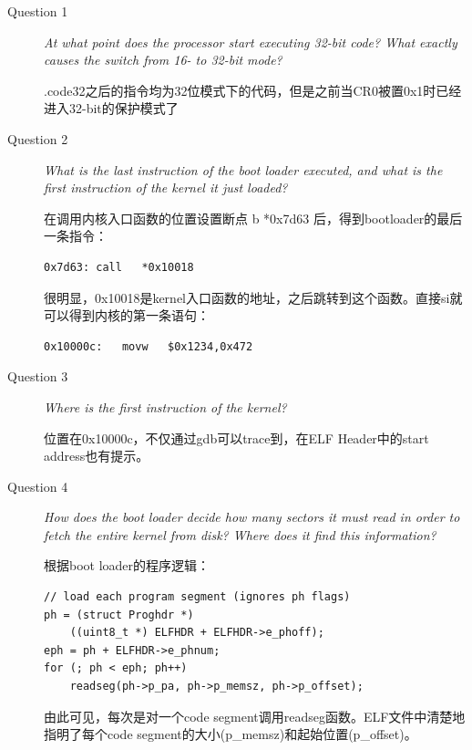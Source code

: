 \begin{description}
\item[Question 1] \textit{At what point does the processor start executing 32-bit code? What exactly causes the switch from 16- to 32-bit mode?}

.code32之后的指令均为32位模式下的代码，但是之前当CR0被置0x1时已经进入32-bit的保护模式了

\item[Question 2] \textit{What is the last instruction of the boot loader executed, and what is the first instruction of the kernel it just loaded?} 

在调用内核入口函数的位置设置断点 b *0x7d63 后，得到bootloader的最后一条指令：\\

\begin{lstlisting}[language={[x86masm]Assembler}]
0x7d63:	call   *0x10018
\end{lstlisting}

很明显，0x10018是kernel入口函数的地址，之后跳转到这个函数。直接si就可以得到内核的第一条语句：\\
\begin{lstlisting}[language={[x86masm]Assembler}]
0x10000c:	movw   $0x1234,0x472
\end{lstlisting}

\item[Question 3] \textit{Where is the first instruction of the kernel?}

位置在0x10000c，不仅通过gdb可以trace到，在ELF Header中的start address也有提示。

\item[Question 4] \textit{How does the boot loader decide how many sectors it must read in order to fetch the entire kernel from disk? Where does it find this information?}

根据boot loader的程序逻辑：\\
\begin{lstlisting}
// load each program segment (ignores ph flags)
ph = (struct Proghdr *) 
    ((uint8_t *) ELFHDR + ELFHDR->e_phoff);
eph = ph + ELFHDR->e_phnum;
for (; ph < eph; ph++)
	readseg(ph->p_pa, ph->p_memsz, ph->p_offset);
\end{lstlisting}
由此可见，每次是对一个code segment调用readseg函数。ELF文件中清楚地指明了每个code segment的大小(p\_memsz)和起始位置(p\_offset)。

\end{description}


